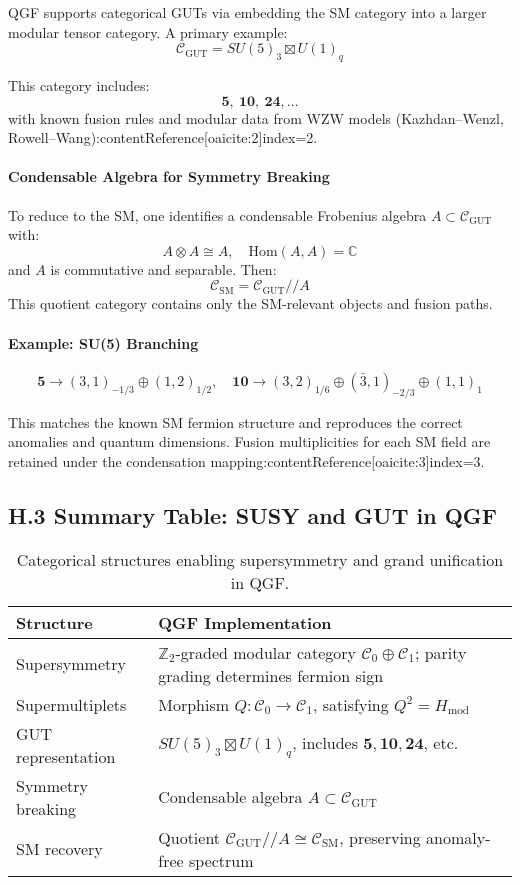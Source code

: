 \documentclass[11pt]{article}
\begin{document}
QGF supports categorical GUTs via embedding the SM category into a larger modular tensor category. A primary example:
\[
\mathcal{C}_{\text{GUT}} = SU(5)_3 \boxtimes U(1)_q
\]

This category includes:
\[
\mathbf{5}, \ \mathbf{10}, \ \mathbf{24}, \ldots
\]
with known fusion rules and modular data from WZW models (Kazhdan–Wenzl, Rowell–Wang):contentReference[oaicite:2]{index=2}.

\paragraph{Condensable Algebra for Symmetry Breaking}

To reduce to the SM, one identifies a condensable Frobenius algebra \( A \subset \mathcal{C}_{\text{GUT}} \) with:
\[
A \otimes A \cong A, \quad \text{Hom}(A,A) = \mathbb{C}
\]
and \( A \) is commutative and separable. Then:
\[
\mathcal{C}_{\text{SM}} = \mathcal{C}_{\text{GUT}} // A
\]
This quotient category contains only the SM-relevant objects and fusion paths.

\paragraph{Example: SU(5) Branching}

\[
\mathbf{5} \rightarrow (3,1)_{-1/3} \oplus (1,2)_{1/2}, \quad
\mathbf{10} \rightarrow (3,2)_{1/6} \oplus (\bar{3},1)_{-2/3} \oplus (1,1)_1
\]

This matches the known SM fermion structure and reproduces the correct anomalies and quantum dimensions. Fusion multiplicities for each SM field are retained under the condensation mapping:contentReference[oaicite:3]{index=3}.

\subsection*{H.3 Summary Table: SUSY and GUT in QGF}

\begin{table}[H]
\centering
\renewcommand{\arraystretch}{1.2}
\begin{tabular}{|p{4.5cm}|p{8cm}|}
\hline
\textbf{Structure} & \textbf{QGF Implementation} \\
\hline
Supersymmetry & \( \mathbb{Z}_2 \)-graded modular category \( \mathcal{C}_0 \oplus \mathcal{C}_1 \); parity grading determines fermion sign \\
\hline
Supermultiplets & Morphism \( Q: \mathcal{C}_0 \to \mathcal{C}_1 \), satisfying \( Q^2 = H_{\text{mod}} \) \\
\hline
GUT representation & \( SU(5)_3 \boxtimes U(1)_q \), includes \( \mathbf{5}, \mathbf{10}, \mathbf{24} \), etc. \\
\hline
Symmetry breaking & Condensable algebra \( A \subset \mathcal{C}_{\text{GUT}} \) \\
\hline
SM recovery & Quotient \( \mathcal{C}_{\text{GUT}} // A \cong \mathcal{C}_{\text{SM}} \), preserving anomaly-free spectrum \\
\hline
\end{tabular}
\caption{Categorical structures enabling supersymmetry and grand unification in QGF.}
\label{tab:susy-gut}
\end{table}
\end{document}
